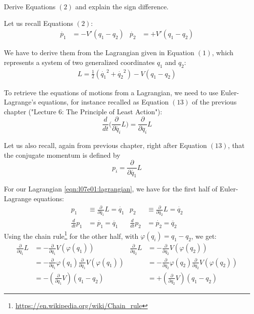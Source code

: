 \documentclass[solutions.tex]{subfiles}
\begin{document}
\maketitle
\begin{exercise}
Derive Equations $(2)$ and explain the sign difference.
\end{exercise}

Let us recall Equations $(2)$:
\begin{align*}
	\dot{p_1} &= -V'(q_1-q_2) &
	\dot{p_2} &= +V'(q_1-q_2)
\end{align*}

We have to derive them from the Lagrangian given in Equation $(1)$,
which represents a system of two generalized coordinates $q_1$
and $q_2$:
\begin{align}
	L = \frac{1}{2}(\dot{q_1}^2+\dot{q_2}^2) - V(q_1-q_2)
	\label{eqn:l07e01:lagrangian}
\end{align}

To retrieve the equations of motions from a Lagrangian, we need
to use Euler-Lagrange's equations, for instance recalled as
Equation $(13)$ of the previous chapter ("Lecture $6$:
The Principle of Least Action"):
\[
	\frac{d}{dt}\biggl(\frac{\partial}{\partial \dot{q_i}}L\biggr)
	= \frac{\partial}{\partial q_i}L
\]

Let us also recall, again from previous chapter, right after
Equation $(13)$, that the conjugate momentum is defined by
\[
	p_i = \frac{\partial}{\partial \dot{q_1}}L
\]

For our Lagrangian \eqref{eqn:l07e01:lagrangian}, we have
for the first half of Euler-Lagrange equations:
\begin{align}
	p_1 &\equiv \frac{\partial}{\partial \dot{q_1}}L = \dot{q_1} &
	p_2 &\equiv \frac{\partial}{\partial \dot{q_2}}L = \dot{q_2} \label{eqn:l07e01:p1} \\
	\frac{d}{dt}p_1 &= \dot{p_1} = \ddot{q_1} &
	\frac{d}{dt}p_2 &= \dot{p_2} = \ddot{q_2} \label{eqn:l07e01:p2}
\end{align}
Using the chain
rule\footnote{\url{https://en.wikipedia.org/wiki/Chain\_rule}}
for the other half, with $\varphi(q_i) = q_1-q_2$, we get:
\begin{align}
	\frac{\partial}{\partial q_1}L &=
		-\frac{\partial}{\partial q_1}V(\varphi(q_1)) &
	\frac{\partial}{\partial q_2}L &=
		-\frac{\partial}{\partial q_2}V(\varphi(q_2)) \nonumber \\
	~ &= -\frac{\partial}{\partial q_1}\varphi(q_1)
		\frac{\partial}{\partial q_1}V(\varphi(q_1)) &
	~ &= -\frac{\partial}{\partial q_2}\varphi(q_2)
		\frac{\partial}{\partial q_2}V(\varphi(q_2)) \nonumber \\
	~ &= -(\frac{\partial}{\partial q_1}V)(q_1-q_2) &
	~ &= +(\frac{\partial}{\partial q_2}V)(q_1-q_2) \label{eqn:l07e01:p3}
\end{align}
\end{document}
